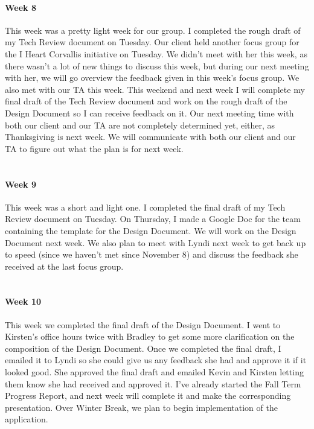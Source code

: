 \documentclass[onecolumn, draftclsnofoot,10pt, compsoc]{IEEEtran}
\begin{document}
      \paragraph{Week 8}
      This week was a pretty light week for our group. I completed the rough draft of my Tech Review document on Tuesday. Our client held another focus group for the I Heart Corvallis initiative on Tuesday. We didn’t meet with her this week, as there wasn’t a lot of new things to discuss this week, but during our next meeting with her, we will go overview the feedback given in this week’s focus group. We also met with our TA this week. This weekend and next week I will complete my final draft of the Tech Review document and work on the rough draft of the Design Document so I can receive feedback on it. Our next meeting time with both our client and our TA are not completely determined yet, either, as Thanksgiving is next week. We will communicate with both our client and our TA to figure out what the plan is for next week. \\ \\

      \paragraph{Week 9}
      This week was a short and light one. I completed the final draft of my Tech Review document on Tuesday. On Thursday, I made a Google Doc for the team containing the template for the Design Document. We will work on the Design Document next week. We also plan to meet with Lyndi next week to get back up to speed (since we haven't met since November 8) and discuss the feedback she received at the last focus group. \\ \\

      \paragraph{Week 10}
      This week we completed the final draft of the Design Document. I went to Kirsten's office hours twice with Bradley to get some more clarification on the composition of the Design Document. Once we completed the final draft, I emailed it to Lyndi so she could give us any feedback she had and approve it if it looked good. She approved the final draft and emailed Kevin and Kirsten letting them know she had received and approved it. I've already started the Fall Term Progress Report, and next week will complete it and make the corresponding presentation. Over Winter Break, we plan to begin implementation of the application. \\ \\
\end{document}
